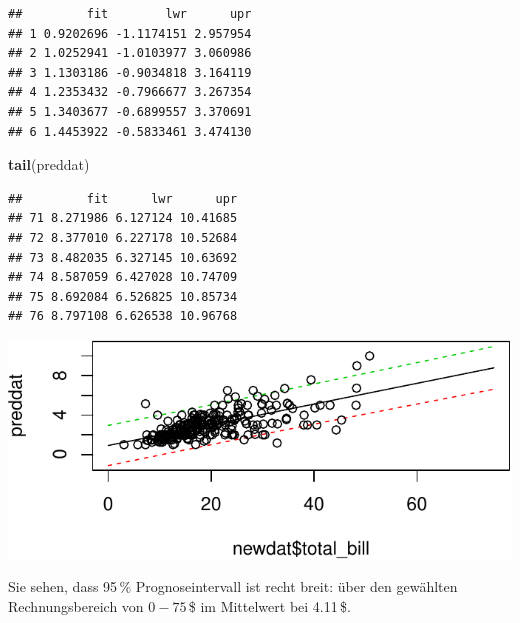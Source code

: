 \documentclass[12pt,ngerman,paper=a4,pagesize,DIV=13]{scrreprt}
\newenvironment{Shaded}{\begin{snugshade}}{\end{snugshade}}
\newcommand{\DataTypeTok}[1]{\textcolor[rgb]{0.13,0.29,0.53}{#1}}
\newcommand{\DecValTok}[1]{\textcolor[rgb]{0.00,0.00,0.81}{#1}}
\newcommand{\KeywordTok}[1]{\textcolor[rgb]{0.13,0.29,0.53}{\textbf{#1}}}
\newcommand{\NormalTok}[1]{#1}
\newcommand{\OperatorTok}[1]{\textcolor[rgb]{0.81,0.36,0.00}{\textbf{#1}}}
\newcommand{\StringTok}[1]{\textcolor[rgb]{0.31,0.60,0.02}{#1}}
\begin{document}
\begin{verbatim}
##         fit        lwr      upr
## 1 0.9202696 -1.1174151 2.957954
## 2 1.0252941 -1.0103977 3.060986
## 3 1.1303186 -0.9034818 3.164119
## 4 1.2353432 -0.7966677 3.267354
## 5 1.3403677 -0.6899557 3.370691
## 6 1.4453922 -0.5833461 3.474130
\end{verbatim}

\begin{Shaded}
\begin{Highlighting}[]
\KeywordTok{tail}\NormalTok{(preddat)}
\end{Highlighting}
\end{Shaded}

\begin{verbatim}
##         fit      lwr      upr
## 71 8.271986 6.127124 10.41685
## 72 8.377010 6.227178 10.52684
## 73 8.482035 6.327145 10.63692
## 74 8.587059 6.427028 10.74709
## 75 8.692084 6.526825 10.85734
## 76 8.797108 6.626538 10.96768
\end{verbatim}

\begin{Shaded}
\end{Shaded}

\includegraphics{DatenerhebungStatistik-Uebung_files/figure-latex/unnamed-chunk-187-1.pdf}

Sie sehen, dass 95\(\,\)\% Prognoseintervall ist recht breit: über den
gewählten Rechnungsbereich von \(0-75\)\(\,\)\$ im Mittelwert bei
4.11\(\,\)\$.
\end{document}
